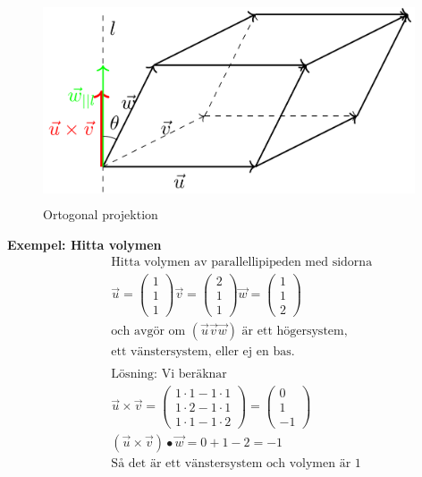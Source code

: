 \begin{figure}[h]
    \vspace{10mm}
    \centering
    \includegraphics[width=11cm, height=6cm]{image/parallelogram.png} 
    \caption{Ortogonal projektion}
\end{figure}

\textbf{Exempel: Hitta volymen}
\begin{align*} 
  &\quad  \text{Hitta volymen av parallellipipeden med sidorna } \\
  &\quad
  \vec{u} = \begin{pmatrix} 1 \\ 1 \\ 1 \end{pmatrix}
  \vec{v} = \begin{pmatrix} 2 \\ 1 \\ 1 \end{pmatrix}
  \vec{w} = \begin{pmatrix} 1 \\ 1 \\ 2 \end{pmatrix} \\
  &\quad  \text{och avgör om $(\vec{u} \vec{v} \vec{w})$ är ett högersystem,} \\
  &\quad  \text{ett vänstersystem, eller ej en bas.} \\
  &\quad  \\
  &\quad  \text{Lösning: Vi beräknar} \\
  &\quad  \vec{u}\times\vec{v} =
  \begin{pmatrix} 1\cdot{1}-1\cdot{1} \\ 1\cdot{2}-1\cdot{1} \\ 1\cdot{1}-1\cdot{2} \end{pmatrix}
  = \begin{pmatrix} 0 \\ 1 \\ -1 \end{pmatrix} \\
  &\quad  (\vec{u}\times\vec{v})\bullet\vec{w} = 0+1-2=-1 \\
  &\quad  \text{Så det är ett vänstersystem och volymen är 1} \\
\end{align*}


